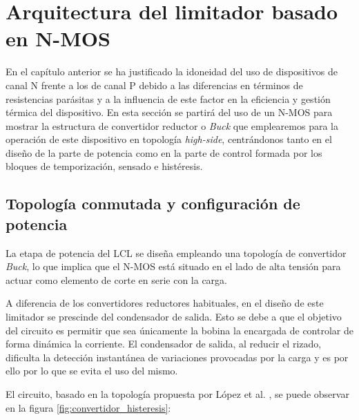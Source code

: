 \documentclass[12pt]{report} %
\begin{document}
\section{Arquitectura del limitador basado en N-MOS}
\label{section:Arquitectura}
En el capítulo anterior se ha justificado la idoneidad del uso de dispositivos de canal N frente a los de canal P debido a las diferencias en términos de resistencias parásitas y a la influencia de este factor en la eficiencia y gestión térmica del dispositivo. En esta sección se partirá del uso de un N-MOS para mostrar la estructura de convertidor reductor o \textit{Buck} que emplearemos para la operación de este dispositivo en topología \textit{high-side}, centrándonos tanto en el diseño de la parte de potencia como en la parte de control formada por los bloques de temporización, sensado e histéresis.

\subsection{Topología conmutada y configuración de potencia}

La etapa de potencia del LCL se diseña empleando una topología de convertidor \textit{Buck}, lo que implica que el N-MOS está situado en el lado de alta tensión para actuar como elemento de corte en serie con la carga.

A diferencia de los convertidores reductores habituales, en el diseño de este limitador se prescinde del condensador de salida. Esto se debe a que el objetivo del circuito es permitir que sea únicamente la bobina la encargada de controlar de forma dinámica la corriente. El condensador de salida, al reducir el rizado, dificulta la detección instantánea de variaciones provocadas por la carga y es por ello por lo que se evita el uso del mismo. 

El circuito, basado en la topología propuesta por López et al. \cite{lopez_antuna_diseno_2024}, se puede observar en la figura \ref{fig:convertidor_histeresis}: 
\end{document}
